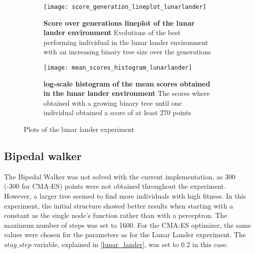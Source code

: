 \begin{figure}[!ht]
    \centering
    \begin{subfigure}{0.48\textwidth}
        \centering
        \texttt{[image: score\_generation\_lineplot\_lunarlander]}  
       	\caption[Score over generations lineplot of the lunar lander environment]{
			\textbf{Score over generations lineplot of the lunar lander environment} Evolutions of the best performing individual in the lunar lander environment with an increasing binary tree size over the generations
			}
		\label{fig:lunar_lineplot}
    \end{subfigure}%
    \hspace{1em}
    \begin{subfigure}{0.48\textwidth}
        \centering
        \texttt{[image: mean\_scores\_histogram\_lunarlander]}  
        \caption[log-scale histogram of the mean scores obtained in the lunar lander environment]{
  			\textbf{log-scale histogram of the mean scores obtained in the lunar lander environment} The scores where obtained with a growing binary tree until one individual obtained a score of at least 270 points
  			}
  		\label{fig:lunar_histogram}
    \end{subfigure}
    \caption{Plots of the lunar lander experiment}
    \label{fig:lunar_lander_plots}
\end{figure}

\subsection{Bipedal walker}
The Bipedal Walker was not solved with the current implementation, as 300 (-300 for CMA-ES) points were not obtained throughout the experiment. However, a larger tree seemed to find more individuals with high fitness. In this experiment, the initial structure showed better results when starting with a constant as the single node's function rather than with a perceptron. The maximum number of steps was set to 1600. For the CMA-ES optimizer, the same values were chosen for the parameters as for the Lunar Lander experiment. The $stag\_step$ variable, explained in \ref{lunar_lander}, was set to 0.2 in this case.

